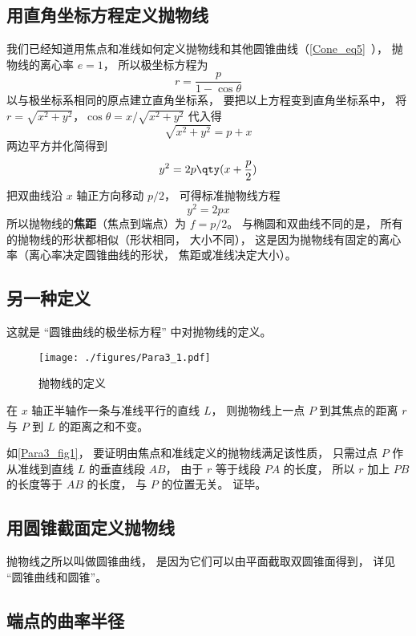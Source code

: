 

\subsection{用直角坐标方程定义抛物线}
我们已经知道用焦点和准线如何定义抛物线和其他圆锥曲线（\autoref{Cone_eq5}~）， 抛物线的离心率 $e = 1$， 所以极坐标方程为
\begin{equation}\label{Para3_eq1}
r = \frac{p}{1 - \cos \theta }
\end{equation}
以与极坐标系相同的原点建立直角坐标系， 要把以上方程变到直角坐标系中， 将$r = \sqrt{x^2 + y^2}$，$\cos \theta  = x/\sqrt{x^2 + y^2}$ 代入得
\begin{equation}
\sqrt{x^2 + y^2}  = p + x
\end{equation}
两边平方并化简得到
\begin{equation}
y^2 = 2p \qty(x + \frac p2)
\end{equation}
把双曲线沿 $x$ 轴正方向移动 $p/2$， 可得标准抛物线方程
\begin{equation}\label{Para3_eq2}
y^2 = 2px
\end{equation}
所以抛物线的\textbf{焦距}（焦点到端点）为 $f = p/2$。 与椭圆和双曲线不同的是， 所有的抛物线的形状都相似（形状相同， 大小不同）， 这是因为抛物线有固定的离心率（离心率决定圆锥曲线的形状， 焦距或准线决定大小）。

\subsection{另一种定义}
这就是 “圆锥曲线的极坐标方程” 中对抛物线的定义。
\begin{figure}[ht]
\centering
\texttt{[image: ./figures/Para3\_1.pdf]}
\caption{抛物线的定义} \label{Para3_fig1}
\end{figure}

在 $x$ 轴正半轴作一条与准线平行的直线 $L$， 则抛物线上一点 $P$ 到其焦点的距离 $r$ 与 $P$ 到 $L$ 的距离之和不变。

如\autoref{Para3_fig1}， 要证明由焦点和准线定义的抛物线满足该性质， 只需过点 $P$ 作从准线到直线 $L$ 的垂直线段 $AB$， 由于 $r$ 等于线段 $PA$ 的长度， 所以 $r$ 加上 $PB$ 的长度等于 $AB$ 的长度， 与 $P$ 的位置无关。 证毕。

\subsection{用圆锥截面定义抛物线}
抛物线之所以叫做圆锥曲线， 是因为它们可以由平面截取双圆锥面得到， 详见 “圆锥曲线和圆锥”。

\subsection{端点的曲率半径}
